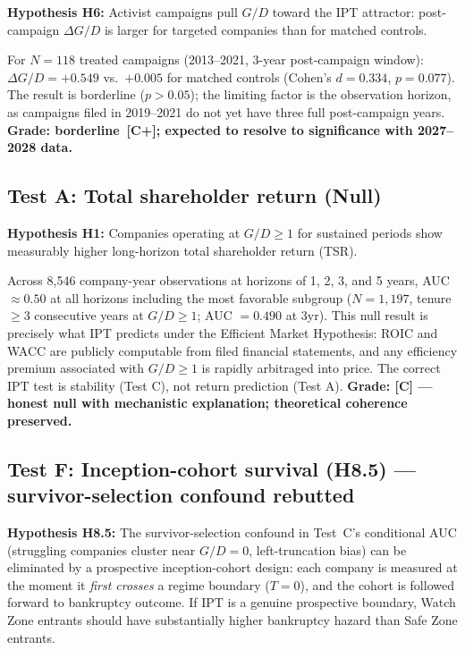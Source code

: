 \documentclass[11pt]{article}
\theoremstyle{remark}
\begin{document}
\textbf{Hypothesis H6:} Activist campaigns pull $G/D$ toward the IPT
attractor: post-campaign $\Delta G/D$ is larger for targeted companies
than for matched controls.

For $N = 118$ treated campaigns (2013--2021, 3-year post-campaign window):
$\Delta G/D = +0.549$ vs.\ $+0.005$ for matched controls
(Cohen's $d = 0.334$, $p = 0.077$).
The result is borderline ($p > 0.05$); the limiting factor is the observation
horizon, as campaigns filed in 2019--2021 do not yet have three full
post-campaign years.
\textbf{Grade: borderline~[C+]; expected to resolve to significance with
2027--2028 data.}

\subsection{Test A: Total shareholder return (Null)}
\label{sec:org:tsr}

\textbf{Hypothesis H1:} Companies operating at $G/D \geq 1$ for sustained
periods show measurably higher long-horizon total shareholder return (TSR).

Across 8,546 company-year observations at horizons of 1, 2, 3, and 5 years,
AUC $\approx 0.50$ at all horizons including the most favorable subgroup
($N = 1{,}197$, tenure $\geq 3$ consecutive years at $G/D \geq 1$;
AUC $= 0.490$ at 3yr).
This null result is precisely what IPT predicts under the Efficient Market
Hypothesis: ROIC and WACC are publicly computable from filed financial
statements, and any efficiency premium associated with $G/D \geq 1$
is rapidly arbitraged into price.
The correct IPT test is stability (Test C), not return prediction (Test A).
\textbf{Grade: [C] --- honest null with mechanistic explanation;
theoretical coherence preserved.}

\subsection{Test F: Inception-cohort survival (H8.5) --- survivor-selection confound rebutted}
\label{sec:org:inception}

\textbf{Hypothesis H8.5:} The survivor-selection confound in Test~C's conditional AUC
(struggling companies cluster near $G/D = 0$, left-truncation bias) can be eliminated by a
prospective inception-cohort design: each company is measured at the moment it \emph{first
crosses} a regime boundary ($T = 0$), and the cohort is followed forward to bankruptcy outcome.
If IPT is a genuine prospective boundary, Watch Zone entrants should have substantially higher
bankruptcy hazard than Safe Zone entrants.
\end{document}
